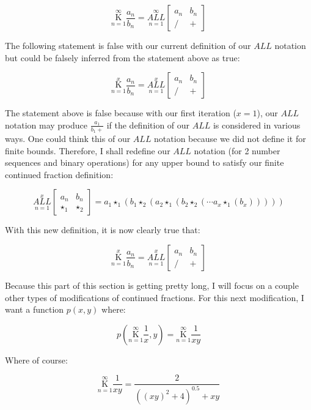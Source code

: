 \documentclass{article}
\begin{document}
$$\underset{n=1}{\overset{\infty}{ \mathrm K}} \frac{a_n}{b_n}=\underset{n=1}{\overset{\infty}{ALL}} \begin{bmatrix}
a_n & b_n \\
/ & +
\end{bmatrix}$$
 
The following statement is false with our current definition of our $ALL$ notation but could be falsely inferred from the statement above as true:

$$\underset{n=1}{\overset{x}{ \mathrm K}} \frac{a_n}{b_n}=\underset{n=1}{\overset{x}{ALL}} \begin{bmatrix}
a_n & b_n \\
/ & +
\end{bmatrix}$$

The statement above is false because with our first iteration ($x=1$), our $ALL$ notation may produce $\frac{a_1}{b_1+}$ if the definition of our $ALL$ is considered in various ways. One could think this of our $ALL$ notation because we did not define it for finite bounds. Therefore, I shall redefine our $ALL$ notation (for 2 number sequences and binary operations) for any upper bound to satisfy our finite continued fraction definition:

$$\underset{n=1}{\overset{x}{ALL}} \begin{bmatrix}
a_n & b_n \\
\star_1 & \star_2
\end{bmatrix} = a_1 \star_1 (b_1 \star_2 (a_2 \star_1 (b_2 \star_2 (\cdots a_x \star_1 (b_x)))))$$

With this new definition, it is now clearly true that:

$$\underset{n=1}{\overset{x}{ \mathrm K}} \frac{a_n}{b_n}=\underset{n=1}{\overset{x}{ALL}} \begin{bmatrix}
a_n & b_n \\
/ & +
\end{bmatrix}$$

Because this part of this section is getting pretty long, I will focus on a couple other types of modifications of continued fractions. For this next modification, I want a function $p(x,y)$ where:

$$p(\underset{n=1}{\overset{\infty}{ \mathrm K}} \frac{1}{x},y)=\underset{n=1}{\overset{\infty}{ \mathrm K}} \frac{1}{xy}$$

Where of course:

$$\underset{n=1}{\overset{\infty}{ \mathrm K}} \frac{1}{xy}=\frac{2}{((xy)^2+4)^{0.5}+xy}$$
\end{document}
